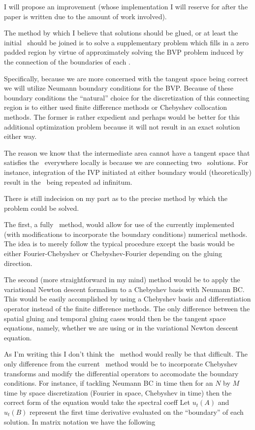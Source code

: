 I will propose an improvement (whose implementation
I will reserve for after the paper is written due to
the amount of work involved).

The method by which I believe that solutions should be
glued, or at least the initial \twots\ should be
joined is to solve a supplementary problem which
fills in a zero padded region by virtue of approximately
solving the BVP problem induced by the connection of the boundaries
of each \twot.

Specifically, because we are more concerned with the
tangent space being correct we will utilize Neumann
boundary conditions for the BVP. Because of these
boundary conditions the ``natural'' choice for the
discretization of this connecting region is to
either used finite difference methods or
Chebyshev collocation methods. The former
is rather expedient and perhaps would be better
for this additional optimization problem because
it will not result in an exact solution either way.

The reason we know that the intermediate area
cannot have a tangent space that satisfies the \KSe\
everywhere locally is because we are connecting two
\twot\ solutions. For instance, integration of the
IVP initiated at either boundary would (theoretically)
result in the \twot\ being repeated ad infinitum.

There is still indecision on my part as to the
precise method by which the problem could be solved.

The first, a fully \spt\ method, would allow for
use of the currently implemented (with modifications
to incorporate the boundary conditions) numerical
methods. The idea is to merely follow the typical
procedure except the basis would be either Fourier-Chebyshev
or Chebyshev-Fourier depending on the gluing direction.

The second (more straightforward in my mind) method
would be to apply the variational Newton descent formalism
to a Chebyshev basis with Neumann BC. This would be
easily accomplished by using a Chebyshev basis and
differentiation operator instead of the finite difference
methods. The only difference between the spatial gluing
and temporal gluing cases would then be
the tangent space equations,
namely, whether we are using  or 
in the variational Newton descent equation.

As I'm writing this I don't think the \spt\ method would
really be that difficult. The only difference from the
current \spt\ method would be to incorporate Chebyshev
transforms and modify the differential
operators to accomodate the boundary conditions.
For instance, if tackling Neumann BC
in time then for an $N$ by $M$ time by space discretization
(Fourier in space, Chebyshev in time) then the
correct form of the equation would take the spectral
coeff
Let $u_t(A)$ and $u_t(B)$ represent the first time
derivative evaluated on the ``boundary'' of each solution.
In matrix notation we have the following



